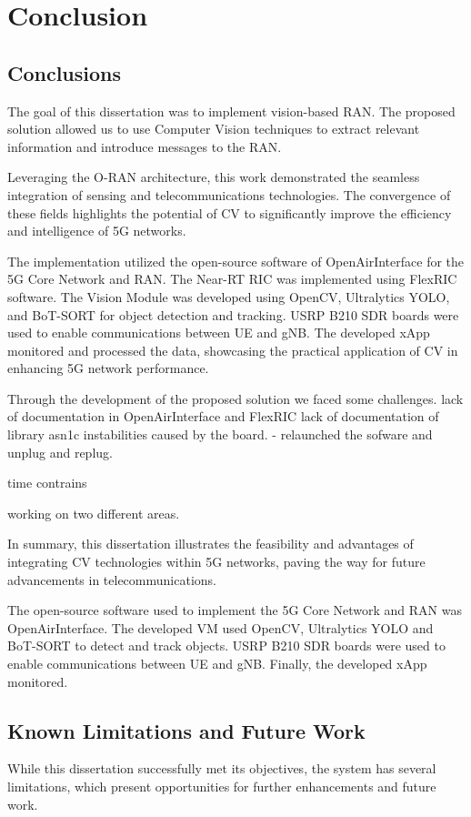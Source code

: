 \chapter{Conclusion}\label{ch:conclusion}

\section{Conclusions}\label{sec:conclusions}
The goal of this dissertation was to implement vision-based RAN\@.
The proposed solution allowed us to use Computer Vision techniques to extract relevant information and introduce messages to the RAN\@.

Leveraging the O-RAN architecture, this work demonstrated the seamless integration of sensing and telecommunications technologies.
The convergence of these fields highlights the potential of CV to significantly improve the efficiency and intelligence of 5G networks.

The implementation utilized the open-source software of OpenAirInterface for the 5G Core Network and RAN\@.
The Near-RT RIC was implemented using FlexRIC software.
The Vision Module was developed using OpenCV, Ultralytics YOLO, and BoT-SORT for object detection and tracking.
USRP B210 SDR boards were used to enable communications between UE and gNB\@.
The developed xApp monitored and processed the data, showcasing the practical application of CV in enhancing 5G network performance.

Through the development of the proposed solution we faced some challenges.
lack of documentation in OpenAirInterface and FlexRIC
lack of documentation of library asn1c
instabilities caused by the board.
- relaunched the sofware and unplug and replug.

time contrains

working on two different areas.

In summary, this dissertation illustrates the feasibility and advantages of integrating CV technologies within 5G networks, paving the way for future advancements in telecommunications.



The open-source software used to implement the 5G Core Network and RAN was OpenAirInterface.
The developed VM used OpenCV, Ultralytics YOLO and BoT-SORT to detect and track objects.
USRP B210 SDR boards were used to enable communications between UE and gNB\@.
Finally, the developed xApp monitored.

\section{Known Limitations and Future Work}\label{sec:fut_work}
While this dissertation successfully met its objectives, the system has several limitations, which present opportunities for further enhancements and future work.


